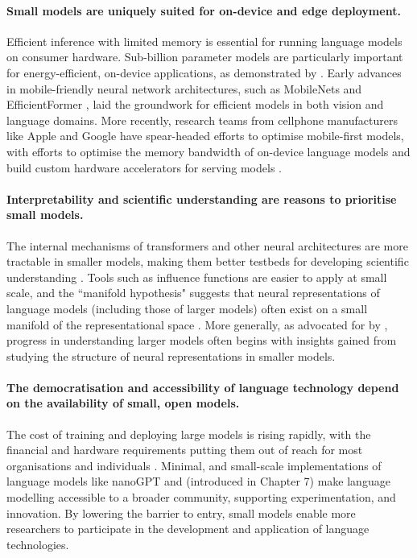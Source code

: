\paragraph{Small models are uniquely suited for on-device and edge deployment.} Efficient inference with limited memory is essential for running language models on consumer hardware. Sub-billion parameter models are particularly important for energy-efficient, on-device applications, as demonstrated by \citet{liu2024mobilellm}. Early advances in mobile-friendly neural network architectures, such as MobileNets \citep{howard2017mobilenets} and EfficientFormer \citep{li2022efficientformer}, laid the groundwork for efficient models in both vision and language domains. More recently, research teams from cellphone manufacturers like Apple and Google have spear-headed efforts to optimise mobile-first models, with efforts to optimise the memory bandwidth of on-device language models \citep{alizadeh2024llm} and build custom hardware accelerators for serving models \citep{deepmind2023gemini}. %
 

\paragraph{Interpretability and scientific understanding are reasons to prioritise small models.} The internal mechanisms of transformers and other neural architectures are more tractable in smaller models, making them better testbeds for developing scientific understanding \citep{elhage2021mathematical, elhage2022toy, anthropic2023components}. Tools such as influence functions are easier to apply at small scale, and the ``manifold hypothesis" suggests that neural representations of language models (including those of larger models) often exist on a small manifold of the representational space \citep{olah2014manifolds}. More generally, as advocated for by \citet{elhage2021mathematical}, progress in understanding larger models often begins with insights gained from studying the structure of neural representations in smaller models.

\paragraph{The democratisation and accessibility of language technology depend on the availability of small, open models.} The cost of training and deploying large models is rising rapidly, with the financial and hardware requirements putting them out of reach for most organisations and individuals \citep{cottier2024rising, sharir2020cost}. Minimal, and small-scale implementations of language models like nanoGPT \citep{karpathy2023nanogpt} and \pico (introduced in Chapter 7) make language modelling accessible to a broader community, supporting experimentation, and innovation. By lowering the barrier to entry, small models enable more researchers to participate in the development and application of language technologies.

